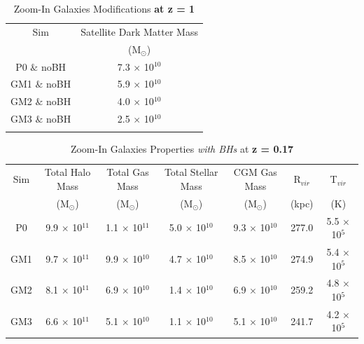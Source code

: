 \documentclass[]{emulateapj}
\begin{document}
\vspace{-5 mm}
\begin{table}[ht] 
\caption{Zoom-In Galaxies Modifications \textbf{at z = 1}} %
\centering %
\begin{tabular}{c c} %
\hline\hline %
Sim & Satellite Dark Matter Mass \\
 & (M$_{\odot}$)\\ [0.5ex] %
\hline %
P0 $\&$ noBH & 7.3 $\times$ 10$^{10}$ \\ %
GM1 $\&$ noBH & 5.9 $\times$ 10$^{10}$ \\
GM2 $\&$ noBH & 4.0 $\times$ 10$^{10}$ \\ %
GM3 $\&$ noBH & 2.5 $\times$ 10$^{10}$ \\ [1ex] %
\hline %
\vspace{0mm}
\end{tabular}
\label{table:satdata} %
\end{table}

\begin{table}[ht!] %
\caption{Zoom-In Galaxies Properties \textit{with BHs} at \textbf{z = 0.17}} %
\centering %
\begin{tabular}{c c c c c c c} %
\hline\hline %
Sim & Total Halo Mass  & Total Gas Mass & Total Stellar Mass & CGM Gas Mass & R$_{vir}$ & T$_{vir}$ \\
 & (M$_{\odot}$) & (M$_{\odot}$) & (M$_{\odot}$) & (M$_{\odot}$) & (kpc) & (K) \\ [0.5ex] %
\hline %
P0 & 9.9 $\times$ 10$^{11}$ & 1.1 $\times$ 10$^{11}$ & 5.0 $\times$ 10$^{10}$ & 9.3 $\times$ 10$^{10}$ & 277.0 & 5.5 $\times$ 10$^5$ \\ 
GM1 & 9.7 $\times$ 10$^{11}$ & 9.9 $\times$ 10$^{10}$ & 4.7 $\times$ 10$^{10}$ & 8.5 $\times$ 10$^{10}$ & 274.9 & 5.4 $\times$ 10$^5$ \\
GM2 & 8.1 $\times$ 10$^{11}$ & 6.9 $\times$ 10$^{10}$ & 1.4 $\times$ 10$^{10}$ & 6.9 $\times$ 10$^{10}$ & 259.2 & 4.8 $\times$ 10$^5$ \\ %
GM3 & 6.6 $\times$ 10$^{11}$ & 5.1 $\times$ 10$^{10}$ & 1.1 $\times$ 10$^{10}$ & 5.1 $\times$ 10$^{10}$ & 241.7 & 4.2 $\times$ 10$^5$ \\ [1ex] %
\hline %
\end{tabular}
\label{table:BHdata} %
\vspace{-2mm}
\end{table}
\end{document}
